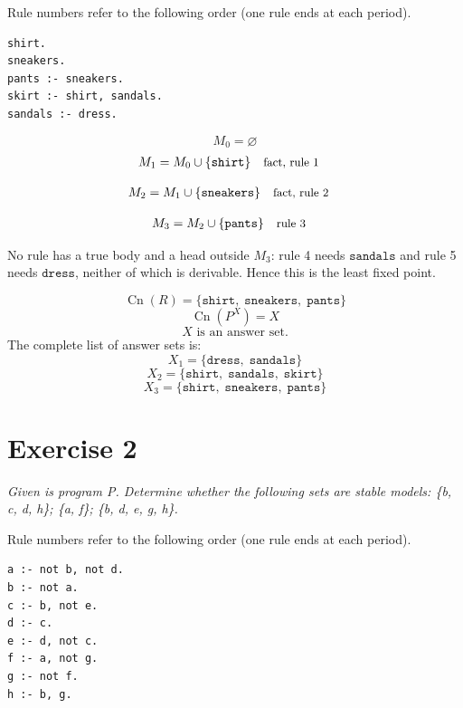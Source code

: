 \documentclass[a4paper,11pt]{article}
\newif\ifexplain
\newcommand{\explain}[1]{\ifexplain\begin{erklbox}#1\end{erklbox}\fi}
\newcommand{\why}[1]{\text{\small #1}}
\newcommand{\angabe}[1]{\textit{#1}\par}
\newcommand{\aufgabe}[1]{\section*{Exercise #1}}
\newcommand{\at}[1]{\texttt{#1}}
\begin{document}
Rule numbers refer to the following order (one rule ends at each period).
\begin{small}
\begin{verbatim}
shirt.
sneakers.
pants :- sneakers.
skirt :- shirt, sandals.
sandals :- dress.
\end{verbatim}
\end{small}
\explain{Beim Redukt bleibt die Kandidatenmenge fest. Wir entscheiden zuerst, welche Regeln wegfallen. Erst danach berechnen wir aus den verbleibenden positiven Regeln die kleinste abgeschlossene Menge. Ein Modell allein reicht nicht: Diese Menge muss genau der Kandidat sein.}
\[
M_0=\varnothing
\]
\begin{align*}
M_{1} &= M_{0}\cup \{\at{shirt}\} && \why{fact, rule 1}
\end{align*}
\explain{Diese Regel hat keinen Körper. Ihr Kopf $\at{shirt}$ ist damit ein Fakt und muss in die Menge.}
\begin{align*}
M_{2} &= M_{1}\cup \{\at{sneakers}\} && \why{fact, rule 2}
\end{align*}
\explain{Diese Regel hat keinen Körper. Ihr Kopf $\at{sneakers}$ ist damit ein Fakt und muss in die Menge.}
\begin{align*}
M_{3} &= M_{2}\cup \{\at{pants}\} && \why{rule 3}
\end{align*}
\explain{Für $\at{pants}$ brauchen wir $\at{sneakers}$. Weil diese Voraussetzung bereits hergeleitet ist, dürfen wir den Regelkopf jetzt aufnehmen und alle bisherigen Atome behalten; bei einer fehlenden Voraussetzung würde diese Regel dagegen noch nichts beitragen.}
No rule has a true body and a head outside $M_{3}$: rule 4 needs $\at{sandals}$ and rule 5 needs $\at{dress}$, neither of which is derivable. Hence this is the least fixed point.
\explain{$\at{sandals}$ hätte im Redukt nur Regel 5 zur Verfügung, die $\at{dress}$ bräuchte. Da $\at{dress}$ fehlt, bleiben beide draußen -- genau das verlangt der Kandidat.}
\[
\operatorname{Cn}(R)=\{\at{shirt},\;\at{sneakers},\;\at{pants}\}
\]
\[
\operatorname{Cn}(P^X)=X
\]
\[
\boxed{X\text{ is an answer set.}}
\]
The complete list of answer sets is:
\[
\boxed{X_1=\{\at{dress},\;\at{sandals}\}}
\]
\[
\boxed{X_2=\{\at{shirt},\;\at{sandals},\;\at{skirt}\}}
\]
\[
\boxed{X_3=\{\at{shirt},\;\at{sneakers},\;\at{pants}\}}
\]
\explain{Alle drei Kandidaten wurden zusätzlich mit dem Solver geprüft: clingo liefert genau diese drei Answer Sets.}
\aufgabe{2}
\angabe{Given is program P. Determine whether the following sets are stable models: \{b, c, d, h\}; \{a, f\}; \{b, d, e, g, h\}.}
Rule numbers refer to the following order (one rule ends at each period).
\begin{small}
\begin{verbatim}
a :- not b, not d.
b :- not a.
c :- b, not e.
d :- c.
e :- d, not c.
f :- a, not g.
g :- not f.
h :- b, g.
\end{verbatim}
\end{small}
\explain{Bei einer Stabilitätsprüfung ist der Kandidat vorgegeben; wir müssen ihn nicht suchen. Prozedur: Redukt bilden, kleinste abgeschlossene Menge berechnen, mit dem Kandidaten vergleichen. Gleichheit heißt stabiles Modell, sonst nicht.}
\end{document}
